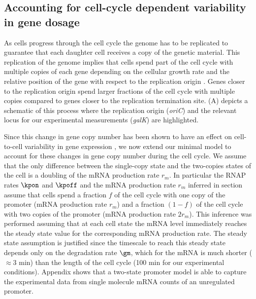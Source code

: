\subsection*{Accounting for cell-cycle dependent variability in gene dosage}
\label{sec_cell_cycle}

As cells progress through the cell cycle the genome has to be replicated to
guarantee that each daughter cell receives a copy of the genetic material.
This replication of the genome implies that cells spend part of the cell cycle
with multiple copies of each gene depending on the cellular growth rate and the
relative position of the gene with respect to the replication origin
\cite{Bremer1996}. Genes closer to the replication origin spend larger fractions
of the cell cycle with multiple copies compared to genes closer to the
replication termination site. (A) depicts a schematic of
this process where the replication origin ({\it oriC}) and the relevant locus
for our experimental measurements ({\it galK}) are highlighted.

Since this change in gene copy number has been shown to have an effect on
cell-to-cell variability in gene expression \cite{Jones2014a, Peterson2015}, we
now extend our minimal model to account for these changes in gene copy number
during the cell cycle.  We assume that the only difference between the
single-copy state and the two-copies states of the cell is a doubling of the
mRNA production rate $r_m$. In particular the RNAP rates $\kpon$ and $\kpoff$
and the mRNA production rate $r_m$ inferred in section 
assume that cells spend a fraction $f$ of the cell cycle  with one copy of the
promoter (mRNA production rate $r_m$) and a fraction $(1-f)$ of the cell cycle
with two copies of the promoter (mRNA production rate $2 r_m$). This inference
was performed assuming that at each cell state the mRNA level immediately
reaches the steady state value for the corresponding mRNA production rate. The
steady state assumption is justified since the timescale to reach this steady
state depends only on the degradation rate $\gm$, which for the mRNA  is much
shorter ($\approx 3$ min) than the length of the cell cycle (100 min for our
experimental conditions). Appendix 
shows that  a two-state promoter model is able to capture the experimental data
from single molecule mRNA counts of an unregulated promoter.

